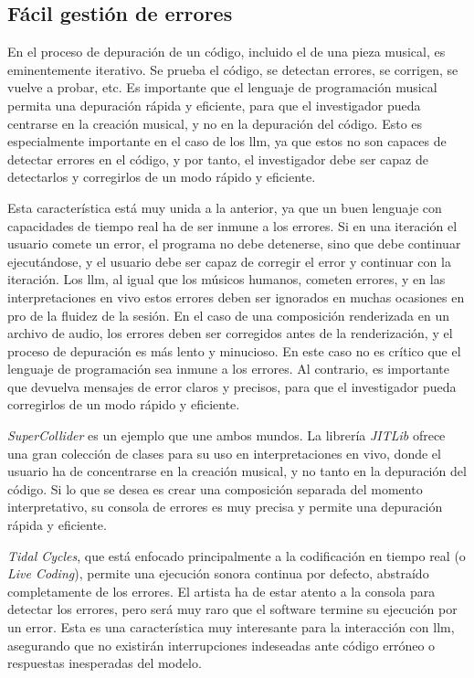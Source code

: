 \subsection{Fácil gestión de errores}
En el proceso de depuración de un código, incluido el de una pieza musical, es eminentemente iterativo. Se prueba el código, se detectan errores, se corrigen, se vuelve a probar, etc. Es importante que el lenguaje de programación musical permita una depuración rápida y eficiente, para que el investigador pueda centrarse en la creación musical, y no en la depuración del código. Esto es especialmente importante en el caso de los \gls{llm}, ya que estos no son capaces de detectar errores en el código, y por tanto, el investigador debe ser capaz de detectarlos y corregirlos de un modo rápido y eficiente.

Esta característica está muy unida a la anterior, ya que un buen lenguaje con capacidades de tiempo real ha de ser inmune a los errores. Si en una iteración el usuario comete un error, el programa no debe detenerse, sino que debe continuar ejecutándose, y el usuario debe ser capaz de corregir el error y continuar con la iteración. Los \gls{llm}, al igual que los músicos humanos, cometen errores, y en las interpretaciones en vivo estos errores deben ser ignorados en muchas ocasiones en pro de la fluidez de la sesión. En el caso de una composición renderizada en un archivo de audio, los errores deben ser corregidos antes de la renderización, y el proceso de depuración es más lento y minucioso. En este caso no es crítico que el lenguaje de programación sea inmune a los errores. Al contrario, es importante que devuelva mensajes de error claros y precisos, para que el investigador pueda corregirlos de un modo rápido y eficiente. 

\textit{SuperCollider} es un ejemplo que une ambos mundos. La librería \textit{JITLib} ofrece una gran colección de clases para su uso en interpretaciones en vivo, donde el usuario ha de concentrarse en la creación musical, y no tanto en la depuración del código. Si lo que se desea es crear una composición separada del momento interpretativo, su consola de errores es muy precisa y permite una depuración rápida y eficiente.

\textit{Tidal Cycles}, que está enfocado principalmente a la codificación en tiempo real (o \textit{Live Coding}), permite una ejecución sonora continua por defecto, abstraído completamente de los errores. El artista ha de estar atento a la consola para detectar los errores, pero será muy raro que el software termine su ejecución por un error. Esta es una característica muy interesante para la interacción con \gls{llm}, asegurando que no existirán interrupciones indeseadas ante código erróneo o respuestas inesperadas del modelo.

